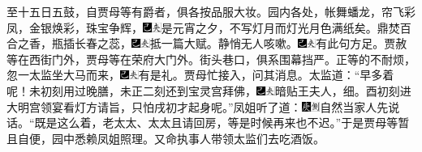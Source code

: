 至十五日五鼓，自贾母等有爵者，俱各按品服大妆。园内各处，帐舞蟠龙，帘飞彩凤，金银焕彩，珠宝争辉，{\includegraphics[width=3mm]{../Images/00003}\includegraphics[width=3mm]{../Images/00012}\footnotesize \kaishu 是元宵之夕，不写灯月而灯光月色满纸矣。}鼎焚百合之香，瓶插长春之蕊，{\includegraphics[width=3mm]{../Images/00003}\includegraphics[width=3mm]{../Images/00012}\footnotesize \kaishu 抵一篇大赋。}静悄无人咳嗽。{\includegraphics[width=3mm]{../Images/00003}\includegraphics[width=3mm]{../Images/00012}\footnotesize \kaishu 有此句方足。}贾赦等在西街门外，贾母等在荣府大门外。街头巷口，俱系围幕挡严。正等的不耐烦，忽一太监坐大马而来，{\includegraphics[width=3mm]{../Images/00003}\includegraphics[width=3mm]{../Images/00012}\footnotesize \kaishu 有是礼。}贾母忙接入，问其消息。太监道：``早多着呢！未初刻用过晚膳，未正二刻还到宝灵宫拜佛，{\includegraphics[width=3mm]{../Images/00003}\includegraphics[width=3mm]{../Images/00012}\footnotesize \kaishu 暗贴王夫人，细。}酉初刻进大明宫领宴看灯方请旨，只怕戌初才起身呢。''凤姐听了道：{\includegraphics[width=3mm]{../Images/00004}\includegraphics[width=3mm]{../Images/00011}\footnotesize \kaishu 自然当家人先说话。}``既是这么着，老太太、太太且请回房，等是时候再来也不迟。''于是贾母等暂且自便，园中悉赖凤姐照理。又命执事人带领太监们去吃酒饭。

